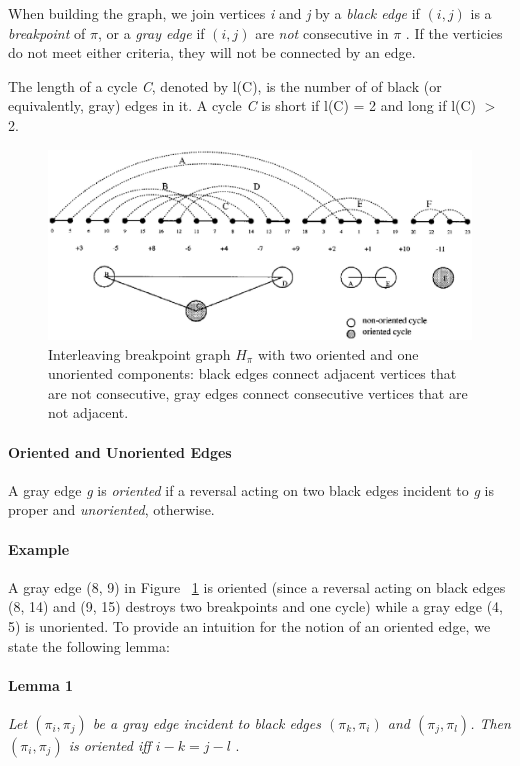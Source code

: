 \documentclass[10pt]{article}
\begin{document}
When building the graph, we join vertices \emph{i} and \emph{j} by a
\emph{black edge} if $(i, j)$ is a \emph{breakpoint} of $\pi$, or a \emph{gray
edge} if $(i, j)$ are \emph{not} consecutive in $\pi$
\cite{_genomerearrangements}. If the verticies do not meet either criteria,
they will not be connected by an edge.

The length of a cycle \emph{C}, denoted by l(C), is the number of of black (or
equivalently, gray) edges in it. A cycle \emph{C} is short if l(C) = 2 and long
if l(C) $>$ 2.

\begin{figure}[here]
\includegraphics[scale=0.35]{resources/figure_2_c_d.eps}
\caption{Interleaving breakpoint graph $H_{\pi}$ with two oriented and one
unoriented components: black edges connect adjacent vertices that are not
consecutive, gray edges connect consecutive vertices that are not adjacent.
\cite{Hannenhalli95transformingcabbage}}
\label{fig:orientedEdges}
\end{figure}

\paragraph{Oriented and Unoriented Edges} A gray edge \emph{g} is
\textit{oriented} if a reversal acting on two black edges incident to \emph{g}
is proper and \textit{unoriented}, otherwise. 

\paragraph{Example} A gray edge (8, 9) in Figure ~\ref{fig:orientedEdges} is
oriented (since a reversal acting on black edges (8, 14) and (9, 15) destroys
two breakpoints and one cycle) while a gray edge (4, 5) is unoriented. To
provide an intuition for the notion of an oriented edge, we state the following
lemma:

\paragraph{Lemma 1} \textit{Let $(\pi_i, \pi_j)$ be a gray edge incident to
black edges $(\pi_k, \pi_i)$ and $(\pi_j, \pi_l)$. Then $(\pi_i, \pi_j)$
is oriented iff $i - k = j - l$} \cite{Hannenhalli95transformingcabbage}.
\end{document}
